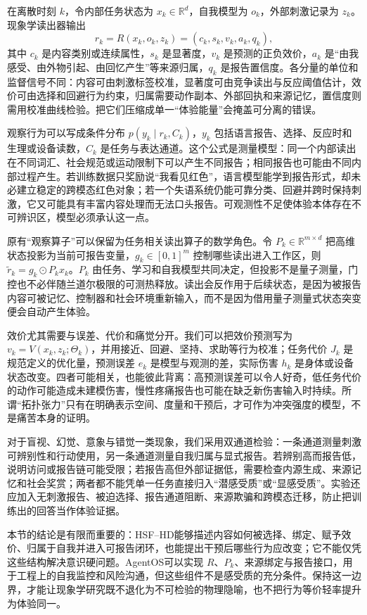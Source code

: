 在离散时刻 $k$，令内部任务状态为 $x_k\in\mathbb R^d$，自我模型为 $o_k$，外部刺激记录为 $z_k$。现象学读出器输出
\[
r_k=R(x_k,o_k,z_k)=
(c_k,s_k,v_k,a_k,q_k),
\]
其中 $c_k$ 是内容类别或连续属性，$s_k$ 是显著度，$v_k$ 是预测的正负效价，$a_k$ 是“由我感受、由外物引起、由回忆产生”等来源归属，$q_k$ 是报告置信度。各分量的单位和监督信号不同：内容可由刺激标签校准，显著度可由竞争读出与反应阈值估计，效价可由选择和回避行为约束，归属需要动作副本、外部回执和来源记忆，置信度则需用校准曲线检验。把它们压缩成单一“体验能量”会掩盖可分离的错误。

观察行为可以写成条件分布 $p(y_k\mid r_k,C_k)$，$y_k$ 包括语言报告、选择、反应时和生理或设备读数，$C_k$ 是任务与表达通道。这个公式是测量模型：同一个内部读出在不同词汇、社会规范或运动限制下可以产生不同报告；相同报告也可能由不同内部过程产生。若训练数据只奖励说“我看见红色”，语言模型能学到报告形式，却未必建立稳定的跨模态红色对象；若一个失语系统仍能可靠分类、回避并跨时保持刺激，它又可能具有丰富内容处理而无法口头报告。可观测性不足使体验本体存在不可辨识区，模型必须承认这一点。

原有“观察算子”可以保留为任务相关读出算子的数学角色。令 $P_k\in\mathbb R^{m\times d}$ 把高维状态投影为当前可报告变量，$g_k\in[0,1]^m$ 控制哪些读出进入工作区，则 $\tilde r_k=g_k\odot P_kx_k$。$P_k$ 由任务、学习和自我模型共同决定，但投影不是量子测量，门控也不必伴随兰道尔极限的可测热释放。读出会反作用于后续状态，是因为被报告内容可被记忆、控制器和社会环境重新输入，而不是因为借用量子测量式状态突变便会自动产生体验。

效价尤其需要与误差、代价和痛觉分开。我们可以把效价预测写为 $v_k=V(x_k,z_k;\Theta_k)$，并用接近、回避、坚持、求助等行为校准；任务代价 $J_k$ 是规范定义的优化量，预测误差 $e_k$ 是模型与观测的差，实际伤害 $h_k$ 是身体或设备状态改变。四者可能相关，也能彼此背离：高预测误差可以令人好奇，低任务代价的动作可能造成未建模伤害，慢性疼痛报告也可能在缺乏新伤害输入时持续。所谓“拓扑张力”只有在明确表示空间、度量和干预后，才可作为冲突强度的模型，不是痛苦本身的证明。

对于盲视、幻觉、意象与错觉一类现象，我们采用双通道检验：一条通道测量刺激可辨别性和行动使用，另一条通道测量自我归属与显式报告。若辨别高而报告低，说明访问或报告链可能受限；若报告高但外部证据低，需要检查内源生成、来源记忆和社会奖赏；两者都不能凭单一任务直接归入“潜感受质”或“显感受质”。实验还应加入无刺激报告、被迫选择、报告通道阻断、来源欺骗和跨模态迁移，防止把训练出的回答当作体验证据。

本节的结论是有限而重要的：HSF--HD能够描述内容如何被选择、绑定、赋予效价、归属于自我并进入可报告闭环，也能提出干预后哪些行为应改变；它不能仅凭这些结构解决意识硬问题。AgentOS可以实现 $R$、$P_k$、来源绑定与报告接口，用于工程上的自我监控和风险沟通，但这些组件不是感受质的充分条件。保持这一边界，才能让现象学研究既不退化为不可检验的物理隐喻，也不把行为等价轻率提升为体验同一。

